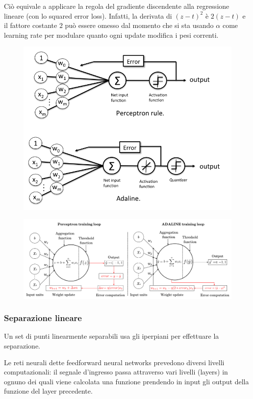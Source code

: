 Ciò equivale a applicare la regola del gradiente discendente alla regressione lineare (con lo squared error loss).
Infatti, la derivata di $(z-t)^2$ è $2(z-t)$ e il fattore costante $2$ può essere omesso dal momento che si sta usando $\alpha$ come learning rate per modulare quanto ogni update modifica i pesi correnti.

\begin{figure}[H]
    \centering
    \includegraphics[scale = 0.8]{imm/perceptron_3.png}
\end{figure}

\begin{figure}[H]
    \centering
    \includegraphics[scale= 0.6]{imm/adaline-math.png}
\end{figure}

\subsubsection{Separazione lineare}
Un set di punti linearmente separabili usa gli iperpiani per effettuare la separazione.

Le reti neurali dette feedforward neural networks prevedono diversi livelli computazionali: il segnale d’ingresso passa attraverso vari livelli (layers) in ognuno dei quali viene calcolata una funzione prendendo in input gli output della funzione del layer precedente.
